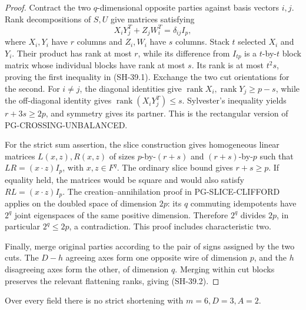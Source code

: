 \begin{proof}
Contract the two $q$-dimensional opposite parties against
basis vectors $i,j$.  Rank decompositions of $S,U$ give
matrices satisfying
\[
 X_iY_j^T+Z_jW_i^T=\delta_{ij}I_p,
\]
where $X_i,Y_i$ have $r$ columns and $Z_i,W_i$ have $s$
columns.  Stack $t$ selected $X_i$ and $Y_i$.  Their
product has rank at most $r$, while its difference from
$I_{tp}$ is a $t$-by-$t$ block matrix whose individual
blocks have rank at most $s$.  Its rank is at most
$t^2s$, proving the first inequality in (SH-39.1).
Exchange the two cut orientations for the second.
For $i\ne j$, the diagonal identities give
$\operatorname{rank}X_i,\operatorname{rank}Y_j\ge p-s$,
while the off-diagonal identity gives
$\operatorname{rank}(X_iY_j^T)\le s$.
Sylvester's inequality yields $r+3s\ge2p$, and symmetry
gives its partner.  This is the rectangular version of
PG-CROSSING-UNBALANCED.

For the strict sum assertion, the slice construction
gives homogeneous linear matrices $L(x,z),R(x,z)$ of
sizes $p$-by-$(r+s)$ and $(r+s)$-by-$p$ such that
$LR=(x\cdot z)I_p$, with $x,z\in F^q$.
The ordinary slice bound gives $r+s\ge p$.  If equality
held, the matrices would be square and would also satisfy
$RL=(x\cdot z)I_p$.  The creation--annihilation proof in
PG-SLICE-CLIFFORD applies on the doubled space of dimension
$2p$: its $q$ commuting idempotents have $2^q$ joint
eigenspaces of the same positive dimension.  Therefore
$2^q$ divides $2p$, in particular $2^q\le2p$, a contradiction.
This proof includes characteristic two.

Finally, merge original parties according to the pair of
signs assigned by the two cuts.  The $D-h$ agreeing axes
form one opposite wire of dimension $p$, and the $h$
disagreeing axes form the other, of dimension $q$.
Merging within cut blocks preserves the relevant
flattening ranks, giving (SH-39.2).
\end{proof}

\begin{theorem}
\label{thm:width-six-dimension-three}
Over every field there is no strict shortening with
$m=6,D=3,A=2$.
\end{theorem}

